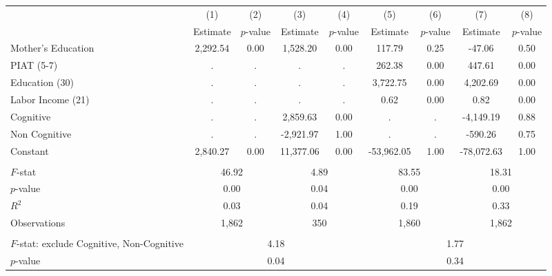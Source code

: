 \begin{tabular}{lcccccccc} \toprule
 & (1) & (2) & (3) & (4) & (5) & (6) & (7) & (8) \\
 & Estimate & $p$-value & Estimate & $p$-value  & Estimate & $p$-value  & Estimate & $p$-value  \\ \midrule 
Mother's Education &     2,292.54 &         0.00 &     1,528.20 &         0.00 &       117.79 &         0.25 &       -47.06 &         0.50 \\  
PIAT (5-7) &            . &            . &            . &            . &       262.38 &         0.00 &       447.61 &         0.00 \\ 
Education (30) &          . &            . &            . &            . &     3,722.75 &         0.00 &     4,202.69 &         0.00 \\  
Labor Income (21) &            . &            . &            . &            . &         0.62 &         0.00 &         0.82 &         0.00 \\  
Cognitive &            . &            . &     2,859.63 &         0.00 &            . &            . &    -4,149.19 &         0.88 \\  
Non Cognitive &            . &            . &    -2,921.97 &         1.00 &            . &            . &      -590.26 &         0.75 \\   
Constant &     2,840.27 &         0.00 &    11,377.06 &         0.00 &   -53,962.05 &         1.00 &   -78,072.63 &         1.00 \\   \\ \midrule
$F$-stat &         \multicolumn{2}{c}{46.92} &              \multicolumn{2}{c}{4.89} &               \multicolumn{2}{c}{83.55} &                \multicolumn{2}{c}{18.31}  \\  
$p$-value &         \multicolumn{2}{c}{0.00} &              \multicolumn{2}{c}{0.04} &               \multicolumn{2}{c}{0.00} &                \multicolumn{2}{c}{0.00}  \\  
$R^2$ &         \multicolumn{2}{c}{0.03} &              \multicolumn{2}{c}{0.04} &               \multicolumn{2}{c}{0.19} &                \multicolumn{2}{c}{0.33}  \\  
Observations &       \multicolumn{2}{c}{1,862} &            \multicolumn{2}{c}{350} &           \multicolumn{2}{c}{1,860} &          \multicolumn{2}{c}{1,862}   \\  \\ \midrule
$F$-stat: exclude Cognitive, Non-Cognitive &                      \multicolumn{4}{c}{4.18} &                      \multicolumn{4}{c}{1.77}   \\  
$p$-value &             \multicolumn{4}{c}{0.04} &                  \multicolumn{4}{c}{0.34}  \\    \bottomrule \end{tabular}
